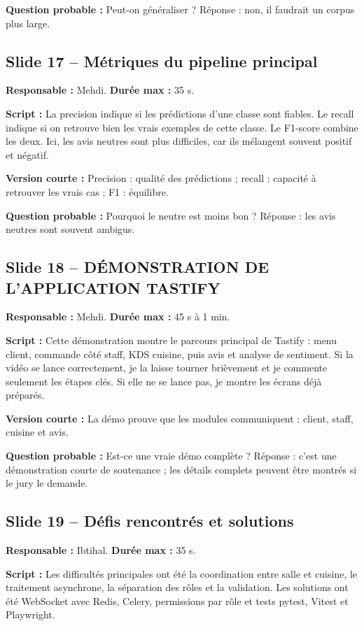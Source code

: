 \documentclass[11pt,a4paper]{article}
\begin{document}
\textbf{Question probable :} Peut-on généraliser ? Réponse : non, il faudrait un corpus plus large.

\subsection*{Slide 17 -- Métriques du pipeline principal}
\textbf{Responsable :} Mehdi. \textbf{Durée max :} 35 s.

\textbf{Script :} La precision indique si les prédictions d'une classe sont fiables. Le recall indique si on retrouve bien les vrais exemples de cette classe. Le F1-score combine les deux. Ici, les avis neutres sont plus difficiles, car ils mélangent souvent positif et négatif.

\textbf{Version courte :} Precision : qualité des prédictions ; recall : capacité à retrouver les vrais cas ; F1 : équilibre.

\textbf{Question probable :} Pourquoi le neutre est moins bon ? Réponse : les avis neutres sont souvent ambigus.

\subsection*{Slide 18 -- DÉMONSTRATION DE L'APPLICATION TASTIFY}
\textbf{Responsable :} Mehdi. \textbf{Durée max :} 45 s à 1 min.

\textbf{Script :} Cette démonstration montre le parcours principal de Tastify : menu client, commande côté staff, KDS cuisine, puis avis et analyse de sentiment. Si la vidéo se lance correctement, je la laisse tourner brièvement et je commente seulement les étapes clés. Si elle ne se lance pas, je montre les écrans déjà préparés.

\textbf{Version courte :} La démo prouve que les modules communiquent : client, staff, cuisine et avis.

\textbf{Question probable :} Est-ce une vraie démo complète ? Réponse : c'est une démonstration courte de soutenance ; les détails complets peuvent être montrés si le jury le demande.

\subsection*{Slide 19 -- Défis rencontrés et solutions}
\textbf{Responsable :} Ibtihal. \textbf{Durée max :} 35 s.

\textbf{Script :} Les difficultés principales ont été la coordination entre salle et cuisine, le traitement asynchrone, la séparation des rôles et la validation. Les solutions ont été WebSocket avec Redis, Celery, permissions par rôle et tests pytest, Vitest et Playwright.
\end{document}
